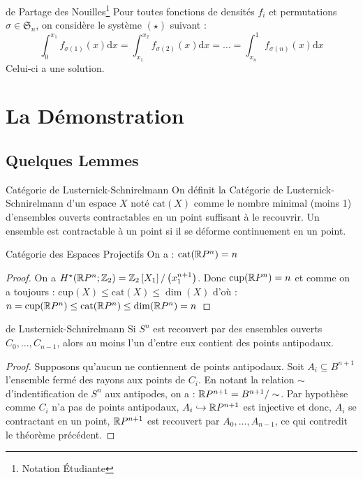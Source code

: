 \documentclass{cours}
\begin{document}
\begin{théorème}{de Partage des Nouilles\footnote{Notation Étudiante}}{}
Pour toutes fonctions de densités $f_{i}$ et permutations $\sigma \in \mathfrak{S}_{n}$, on considère le système $(\star)$ suivant :
\begin{equation*}\tag{$\star$}
    \int_{0}^{x_{1}}f_{\sigma(1)}(x) \mathrm{d}x = \int_{x_{1}}^{x_{2}}f_{\sigma(2)}(x)\mathrm{d}x = \ldots = \int_{x_{n}}^{1}f_{\sigma(n)}(x) \mathrm{d}x
\end{equation*}
Celui-ci a une solution.
\end{théorème}

\section{La Démonstration}
\subsection{Quelques Lemmes}
\begin{définition}{Catégorie de Lusternick-Schnirelmann}{}
On définit la Catégorie de Lusternick-Schnirelmann d'un espace $X$ noté $\text{cat}(X)$ comme le nombre minimal (moins 1) d'ensembles ouverts contractables en un point suffisant à le recouvrir. Un ensemble est contractable à un point si il se déforme continuement en un point.
\end{définition}

\begin{lemme}{Catégorie des Espaces Projectifs}{}
    On a : $\text{cat}(\mathbb{R} P^{n}) = n$
\end{lemme}
\begin{proof}
    On a $H^{\star}(\mathbb{R} P^{n}; \mathbb{Z}_{2}) = \mathbb{Z}_{2}\left[X_{1}\right]/\left(x_{1}^{n + 1}\right)$. Donc $\text{cup}(\mathbb{R} P^{n}) = n$ et comme on a toujours :
    $\text{cup}(X) \leq \text{cat}(X)\leq \dim(X)$ d'où : $n = \text{cup}(\mathbb{R} P^{n}) \leq \text{cat}(\mathbb{R} P^{n}) \leq \dim(\mathbb{R} P^{n}) = n$
\end{proof}

\begin{théorème}{de Lusternick-Schnirelmann}{}
Si $S^{n}$ est recouvert par des ensembles ouverts $C_{0}, \ldots, C_{n - 1}$, alors au moins l'un d'entre eux contient des points antipodaux.
\end{théorème}
\begin{proof}
    Supposons qu'aucun ne contiennent de points antipodaux. Soit $A_{i} \subseteq B^{n + 1}$ l'ensemble fermé des rayons aux points de $C_{i}$. En notant la relation $\sim$ d'indentification de $S^{n}$ aux antipodes, on a : $\mathbb{R} P^{n + 1} = B^{n + 1}/\sim$. Par hypothèse comme $C_{i}$ n'a pas de points antipodaux, $A_{i} \hookrightarrow \mathbb{R} P^{n+1}$ est injective et donc, $A_{i}$ se contractant en un point, $\mathbb{R} P^{n + 1}$ est recouvert par $A_{0}, \ldots, A_{n - 1}$, ce qui contredit le théorème précédent.
\end{proof}
\end{document}
